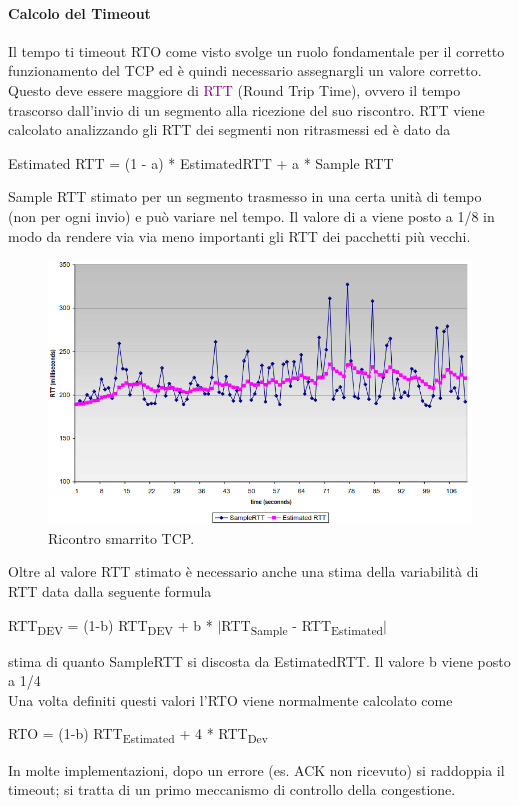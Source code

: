 \paragraph{Calcolo del Timeout}
Il tempo ti timeout RTO come visto svolge un ruolo fondamentale per il corretto funzionamento del TCP ed è quindi necessario assegnargli un valore corretto.
Questo deve essere maggiore di \textcolor{purple}{RTT} (Round Trip Time), ovvero il tempo trascorso dall'invio di un segmento alla ricezione del suo riscontro.
RTT viene calcolato analizzando gli RTT dei segmenti non ritrasmessi ed è dato da
\begin{center}
    Estimated RTT = (1 - a) * EstimatedRTT + a * Sample RTT
\end{center}
Sample RTT stimato per un segmento trasmesso in una certa unità di tempo (non per ogni invio) e può variare nel tempo.
Il valore di a viene posto a 1/8 in modo da rendere via via meno importanti gli RTT dei pacchetti più vecchi.
\begin{figure}[h]
    \centering
    \includegraphics[scale=0.46]{Immagini/EstimatedRTT.png}
    \caption{Ricontro smarrito TCP.}
\end{figure}
\newpage
Oltre al valore RTT stimato è necessario anche una stima della variabilità di RTT data dalla seguente formula
\begin{center}
    RTT\textsubscript{DEV} = (1-b) RTT\textsubscript{DEV} + b * $|$RTT\textsubscript{Sample} - RTT\textsubscript{Estimated}$|$
\end{center}
stima di quanto SampleRTT si discosta da EstimatedRTT.
Il valore b viene posto a 1/4
\\Una volta definiti questi valori l'RTO viene normalmente calcolato come
\begin{center}
    RTO = (1-b) RTT\textsubscript{Estimated} + 4 * RTT\textsubscript{Dev}
\end{center}
In molte implementazioni, dopo un errore (es. ACK non ricevuto) si raddoppia il timeout; si tratta di un primo meccanismo di controllo della congestione.

